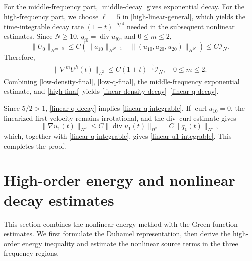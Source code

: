 \documentclass[10pt,reqno]{amsart}
\numberwithin{equation}{section}
\begin{document}
For the middle-frequency part, \eqref{middle-decay} gives exponential decay. For the high-frequency part, we choose $\ell=5$ in \eqref{high-linear-general}, which yields the time-integrable decay rate $(1+t)^{-5/4}$ needed in the subsequent nonlinear estimates. Since $N\ge10$, $q_{i0}=\operatorname{div}u_{i0}$, and $0\le m\le2$,
\[
\|U_0\|_{H^{m+5}}
\le C\left(\|a_{10}\|_{H^{N-1}}+\|(u_{10},a_{20},u_{20})\|_{H^N}\right)
\le C\mathcal I_N.
\]
Therefore,
\begin{align}\label{high-final}
\|\nabla^mU^h(t)\|_{L^2}
\le C(1+t)^{-\frac54}\mathcal I_N,
\quad 0\le m\le2.
\end{align}
Combining \eqref{low-density-final}, \eqref{low-q-final}, the middle-frequency exponential estimate, and \eqref{high-final} yields \eqref{linear-density-decay}--\eqref{linear-q-decay}.

Since $5/2>1$, \eqref{linear-q-decay} implies \eqref{linear-q-integrable}.  If $\operatorname{curl}u_{10}=0$, the linearized first velocity remains irrotational, and the div--curl estimate gives
\[
\|\nabla u_1(t)\|_{H^2}\le C\|\operatorname{div}u_1(t)\|_{H^2}
=C\|q_1(t)\|_{H^2},
\]
which, together with \eqref{linear-q-integrable}, gives \eqref{linear-u1-integrable}. This completes the proof.
\endproof


%
%
%
%
%
%

\section{High-order energy and nonlinear decay estimates}\label{S5}
This section combines the nonlinear energy method with the Green-function estimates. We first formulate the Duhamel representation, then derive the high-order energy inequality and estimate the nonlinear source terms in the three frequency regions.
\end{document}

